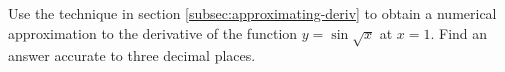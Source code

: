 Use the technique in section \ref{subsec:approximating-deriv} to
obtain a numerical approximation to the derivative of the
function $y=\sin \sqrt{x}$ at $x=1$. Find an answer accurate to
three decimal places.\answercheck
